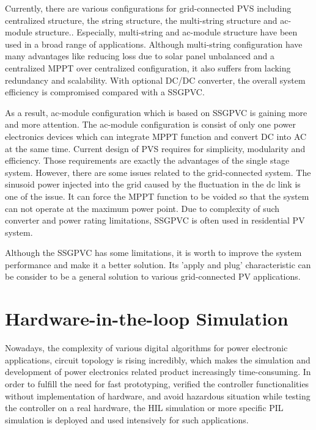Currently, there are various configurations for grid-connected \gls{PVS} including centralized structure, the string structure, the multi-string structure and ac-module structure.\cite{5540302}. Especially, multi-string and ac-module structure have been used in a broad range of applications. Although multi-string configuration have many advantages like reducing loss due to solar panel unbalanced and a centralized \gls{MPPT} over centralized configuration, it also suffers from lacking redundancy and scalability. With optional DC/DC converter, the overall system efficiency is compromised compared with a \gls{SSGPVC}. 

As a result, ac-module configuration which is based on \gls{SSGPVC} is gaining more and more attention. The ac-module configuration is consist of only one power electronics devices which can integrate \gls{MPPT} function and convert \gls{DC} into \gls{AC} at the same time. Current design of \gls{PVS} requires for simplicity, modularity and efficiency. Those requirements are exactly the advantages of the single stage system. However, there are some issues related to the grid-connected system. The sinusoid power injected into the grid caused by the fluctuation in the dc link is one of the issue.\cite{5200525} It can force the \gls{MPPT} function to be voided so that the system can not operate at the maximum power point. Due to complexity of such converter and power rating limitations, \gls{SSGPVC} is often used in residential PV system. 

Although the \gls{SSGPVC} has some limitations, it is worth to improve the system performance and make it a better solution. Its 'apply and plug' characteristic can be consider to be a general solution to various grid-connected \gls{PV} applications. 

\section{Hardware-in-the-loop Simulation}\label{sec:HIL}
Nowadays, the complexity of various digital algorithms for power electronic applications, circuit topology is rising incredibly, which makes the simulation and development of power electronics related product increasingly time-consuming.\cite{7497546} In order to fulfill the need for fast prototyping, verified the controller functionalities without implementation of hardware, and avoid hazardous situation while testing the controller on a real hardware, the \gls{HIL} simulation or more specific \gls{PIL} simulation is deployed and used intensively for such applications. 

